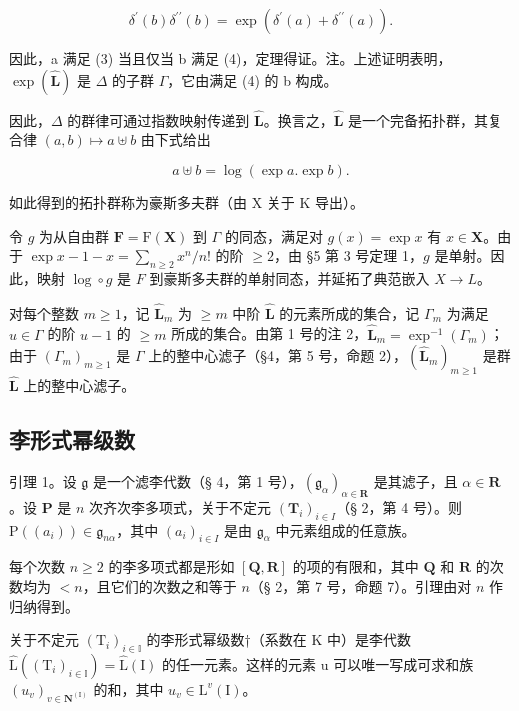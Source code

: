 \[
\delta^ {\prime} (b) \delta^ {\prime \prime} (b) = \exp (\delta^ {\prime} (a) + \delta^ {\prime \prime} (a)).
\]

因此，a 满足 (3) 当且仅当 b 满足 (4)，定理得证。注。上述证明表明，\(\exp(\hat{\mathbf{L}})\) 是 \(\Delta\) 的子群 \(\Gamma\)，它由满足 (4) 的 b 构成。

因此，\(\Delta\) 的群律可通过指数映射传递到 \(\hat{\mathbf{L}}\)。换言之，\(\hat{\mathbf{L}}\) 是一个完备拓扑群，其复合律 \((a, b) \mapsto a \uplus b\) 由下式给出

\[
a \uplus b = \log (\exp a. \exp b).
\]

如此得到的拓扑群称为豪斯多夫群（由 X 关于 K 导出）。

令 \(g\) 为从自由群 \(\mathbf{F} = \mathrm{F}(\mathbf{X})\) 到 \(\Gamma\) 的同态，满足对 \(g(x) = \exp x\) 有 \(x \in \mathbf{X}\)。由于 \(\exp x - 1 - x = \sum_{n \geqslant 2} x^n / n!\) 的阶 \(\geqslant 2\)，由 §5 第 3 号定理 1，\(g\) 是单射。因此，映射 \(\log \circ g\) 是 \(F\) 到豪斯多夫群的单射同态，并延拓了典范嵌入 \(X \to L\)。

对每个整数 \(m \geqslant 1\)，记 \(\hat{\mathbf{L}}_m\) 为 \(\geqslant m\) 中阶 \(\hat{\mathbf{L}}\) 的元素所成的集合，记 \(\Gamma_m\) 为满足 \(u \in \Gamma\) 的阶 \(u - 1\) 的 \(\geqslant m\) 所成的集合。由第 1 号的注 2，\(\hat{\mathbf{L}}_m = \exp^{-1}(\Gamma_m)\)；由于 \((\Gamma_m)_{m \geqslant 1}\) 是 \(\Gamma\) 上的整中心滤子（§4，第 5 号，命题 2），\((\hat{\mathbf{L}}_m)_{m \geqslant 1}\) 是群 \(\hat{\mathbf{L}}\) 上的整中心滤子。

\subsection{李形式幂级数}

引理 1。设 \(\mathfrak{g}\) 是一个滤李代数（§ 4，第 1 号），\((\mathfrak{g}_{\alpha})_{\alpha \in \mathbf{R}}\) 是其滤子，且 \(\alpha \in \mathbf{R}\)。设 \(\mathbf{P}\) 是 \(n\) 次齐次李多项式，关于不定元 \((\mathbf{T}_i)_{i \in I}\)（§ 2，第 4 号）。则 \(\mathrm{P}((a_i)) \in \mathfrak{g}_{n\alpha}\)，其中 \((a_i)_{i \in I}\) 是由 \(\mathfrak{g}_{\alpha}\) 中元素组成的任意族。

每个次数 \(n \geqslant 2\) 的李多项式都是形如 \([\mathbf{Q}, \mathbf{R}]\) 的项的有限和，其中 \(\mathbf{Q}\) 和 \(\mathbf{R}\) 的次数均为 \(< n\)，且它们的次数之和等于 \(n\)（§ 2，第 7 号，命题 7）。引理由对 \(n\) 作归纳得到。

关于不定元 \((\mathrm{T}_{i})_{i\in\mathbb{I}}\) 的李形式幂级数†（系数在 K 中）是李代数 \(\hat{\mathrm{L}}((\mathrm{T}_{i})_{i\in\mathbb{I}})=\hat{\mathrm{L}}(\mathrm{I})\) 的任一元素。这样的元素 u 可以唯一写成可求和族 \((u_{v})_{v\in\mathbf{N}^{(\mathrm{I})}}\) 的和，其中 \(u_{v}\in\mathrm{L}^{v}(\mathrm{I})\)。

